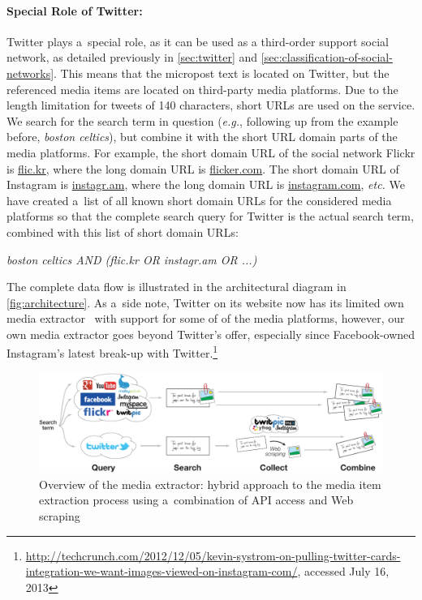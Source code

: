 \paragraph{Special Role of Twitter:}

Twitter plays a~special role, as it can be used as
a third-order support social network,
as detailed previously in
\autoref{sec:twitter}
and \autoref{sec:classification-of-social-networks}.
This means that the micropost text is located on Twitter,
but the referenced media items are located
on third-party media platforms.
Due to the length limitation for tweets of 140 characters,
short URLs are used on the service.
We search for the search term in question (\emph{e.g.},
following up from the example before, \emph{boston celtics}),
but combine it with the short URL domain parts of
the media platforms.
For example, the short domain URL of the social network Flickr
is \url{flic.kr}, where the long domain URL is \url{flicker.com}.
The short domain URL of Instagram is \url{instagr.am},
where the long domain URL is \url{instagram.com}, \emph{etc.}
We have created a~list of all known short domain URLs for the 
considered media platforms so that the complete search query
for Twitter is the actual search term,
combined with this list of short domain URLs:

\emph{boston celtics AND (flic.kr OR instagr.am OR ...)}

\noindent The complete data flow is illustrated in the
architectural diagram in \autoref{fig:architecture}.
As a~side note, Twitter on its website now has its limited own
media extractor~\cite{wang2012twitter}
with support for some of of the media platforms,
however, our own media extractor goes beyond Twitter's offer,
especially since Facebook-owned Instagram's latest break-up with
Twitter.\footnote{\url{http://techcrunch.com/2012/12/05/kevin-systrom-on-pulling-twitter-cards-integration-we-want-images-viewed-on-instagram-com/}, accessed July 16, 2013}

\begin{figure}
  \centering
  \includegraphics[width=1.0\linewidth]{architecture.pdf}
  \caption[Overview of the media extractor]
    {Overview of the media extractor:
    hybrid approach to the media item extraction process using
    a~combination of API access and Web scraping}
  \label{fig:architecture}
\end{figure}

